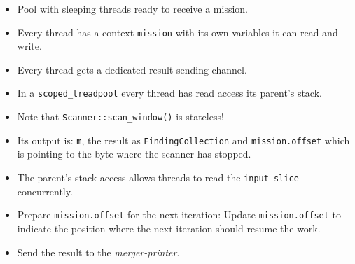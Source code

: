 \begin{Shaded}
\begin{Highlighting}[]
      
         
         \NormalTok{|| \{  }
             
                            \NormalTok{&} 

              
             \NormalTok{\} } \NormalTok{\{}
             \NormalTok{\};}

             
                 \NormalTok{(_) => \{\},}
                 \NormalTok{(_) => \{ }\NormalTok{(}\NormalTok{); \},}
             \NormalTok{\};}
        \NormalTok{\});}
    \NormalTok{\}}
\NormalTok{\});}
\end{Highlighting}
\end{Shaded}

\begin{itemize}
\item
  Pool with sleeping threads ready to receive a mission.
\item
  Every thread has a context \texttt{mission} with its own variables it
  can read and write.
\item
  Every thread gets a dedicated result-sending-channel.
\item
  In a \texttt{scoped\_treadpool} every thread has read access its
  parent's stack.
\item
  Note that \texttt{Scanner::scan\_window()} is stateless!
\item
  Its output is: \texttt{m}, the result as \texttt{FindingCollection}
  and \texttt{mission.offset} which is pointing to the byte where the
  scanner has stopped.
\item
  The parent's stack access allows threads to read the
  \texttt{input\_slice} concurrently.
\item
  Prepare \texttt{mission.offset} for the next iteration: Update
  \texttt{mission.offset} to indicate the position where the next
  iteration should resume the work.
\item
  Send the result to the \emph{merger-printer}.
\end{itemize}

